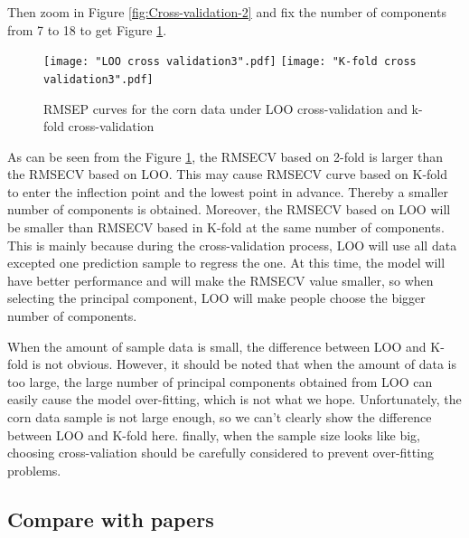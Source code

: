 \documentclass[a4paper,12pt,titlepage]{article} %
\numberwithin{equation}{section}  %
\begin{document}
	Then zoom in Figure \ref{fig:Cross-validation-2} and fix the number of components from 7 to 18 to get Figure \ref{fig:Cross-validation-3}.
		
	\begin{figure}[h]    %
		\centering           %
		\texttt{[image: "LOO cross validation3".pdf]}  %
		\texttt{[image: "K-fold cross validation3".pdf]}  %
		\caption{RMSEP curves for the corn data under LOO cross-validation  and k-fold cross-validation}          %
		\label{fig:Cross-validation-3}               %
	\end{figure}                        %
	
	As can be seen from the Figure \ref{fig:Cross-validation-3}, the RMSECV based on 2-fold is larger than the RMSECV based on LOO. This may cause RMSECV curve based on K-fold to enter the inflection point and the lowest point in advance. Thereby a smaller number of components is obtained. Moreover, the RMSECV based on LOO will be smaller than RMSECV based in K-fold at the same number of components. This is mainly because during the cross-validation process, LOO will use all data excepted one prediction sample to regress the one. At this time, the model will have better performance and will make the RMSECV value smaller, so when selecting the principal component, LOO will make people choose the bigger number of components.
	
	When the amount of sample data is small, the difference between LOO and K-fold is not obvious. However, it should be noted that when the amount of data is too large, the large number of principal components obtained from LOO can easily cause the model over-fitting, which is not what we hope. Unfortunately, the corn data sample is not large enough, so we can't clearly show the difference between LOO and K-fold here. finally, when the sample size looks like big, choosing cross-valiation should be carefully considered to prevent over-fitting problems.
	
	\subsection{Compare with papers}
	\label{sec:Compare with papers}
	
\end{document}
